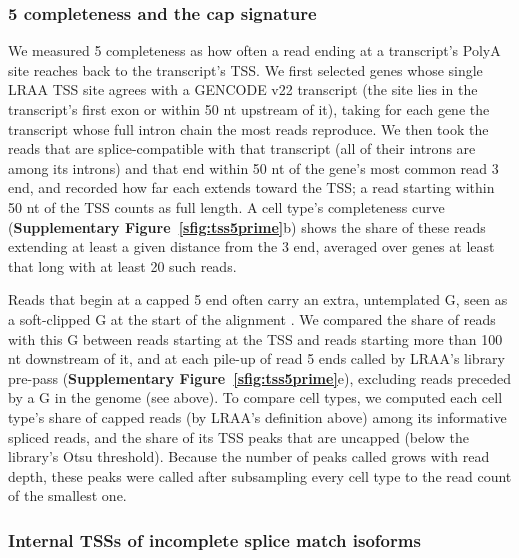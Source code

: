 \subsubsection{5\p{} completeness and the cap signature}\label{five-prime-completeness-and-the-cap-signature}

We measured 5\p{} completeness as how often a read ending at a transcript's PolyA site reaches back to the transcript's TSS. We first selected genes whose single LRAA TSS site agrees with a GENCODE v22 transcript (the site lies in the transcript's first exon or within 50 nt upstream of it), taking for each gene the transcript whose full intron chain the most reads reproduce. We then took the reads that are splice-compatible with that transcript (all of their introns are among its introns) and that end within 50 nt of the gene's most common read 3\p{} end, and recorded how far each extends toward the TSS; a read starting within 50 nt of the TSS counts as full length. A cell type's completeness curve (\textbf{Supplementary Figure~\ref{sfig:tss5prime}}b) shows the share of these reads extending at least a given distance from the 3\p{} end, averaged over genes at least that long with at least 20 such reads.

Reads that begin at a capped 5\p{} end often carry an extra, untemplated G, seen as a soft-clipped G at the start of the alignment \citep{wulf2019, cumbie2015, moody2022}. We compared the share of reads with this G between reads starting at the TSS and reads starting more than 100 nt downstream of it, and at each pile-up of read 5\p{} ends called by LRAA's library pre-pass (\textbf{Supplementary Figure~\ref{sfig:tss5prime}}e), excluding reads preceded by a G in the genome (see above). To compare cell types, we computed each cell type's share of capped reads (by LRAA's definition above) among its informative spliced reads, and the share of its TSS peaks that are uncapped (below the library's Otsu threshold). Because the number of peaks called grows with read depth, these peaks were called after subsampling every cell type to the read count of the smallest one.

\subsubsection{Internal TSSs of incomplete splice match isoforms}\label{internal-tss-of-ism-isoforms}

